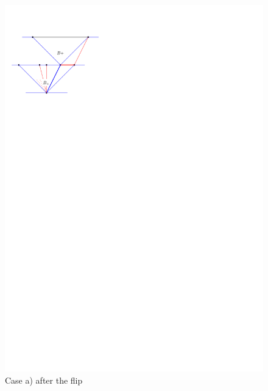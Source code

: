 \begin{figure}[h]
  \centering
  \includegraphics[scale=1]{unifiedAlgo/img/flipactiona}
  \caption{Case a) after the flip}
  \label{fig:uni:flipactiona}
\end{figure}


